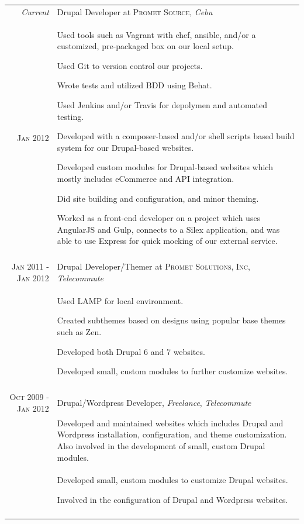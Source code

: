 \documentclass[a4paper,10pt]{article}
\begin{document}
\begin{tabular}{r|p{11cm}}
  \emph{Current}    & Drupal Developer at \textsc{Promet Source}, \emph{Cebu}\\
  \textsc{Jan 2012} &
  \begin{blacklist}
    \item Used tools such as Vagrant with chef, ansible, and/or a customized, pre-packaged box on our local setup.
    \item Used Git to version control our projects.
    \item Wrote tests and utilized BDD using Behat.
    \item Used Jenkins and/or Travis for depolymen and automated testing.
    \item Developed with a composer-based and/or shell scripts based build system for our Drupal-based websites.
    \item Developed custom modules for Drupal-based websites which mostly includes eCommerce and API integration.
    \item Did site building and configuration, and minor theming.
    \item Worked as a front-end developer on a project which uses AngularJS and Gulp, connects to a Silex application, and was able to use Express for quick mocking of our external service.
  \end{blacklist}\\
  \multicolumn{2}{c}{}\\

  \textsc{Jan 2011 - Jan 2012} & Drupal Developer/Themer at \textsc{Promet Solutions, Inc}, \emph{Telecommute}\\ &
  \begin{blacklist}
    \item Used LAMP for local environment.
    \item Created subthemes based on designs using popular base themes such as Zen.
    \item Developed both Drupal 6 and 7 websites.
    \item Developed small, custom modules to further customize websites.
  \end{blacklist}\\
  \multicolumn{2}{c}{}\\

  \textsc{Oct 2009 - Jan 2012} & Drupal/Wordpress Developer, \emph{Freelance}, \emph{Telecommute}\\ &
  \footnotesize{Developed and maintained websites which includes Drupal and Wordpress installation, configuration, and theme customization. Also involved in the development of small, custom Drupal modules.}\\ &
  \begin{blacklist}
    \item Developed small, custom modules to customize Drupal websites.
    \item Involved in the configuration of Drupal and Wordpress websites.
  \end{blacklist}\\
  \multicolumn{2}{c}{}\\


\end{tabular}
\end{document}
